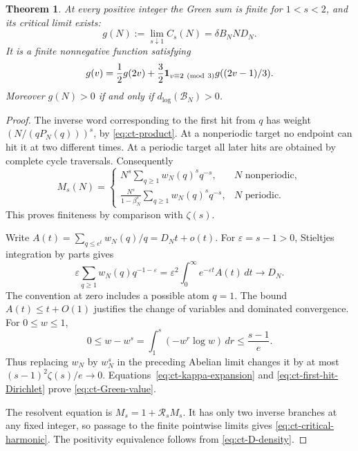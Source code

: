 \documentclass[11pt,a4paper]{article}
\newtheorem{theorem}{Theorem}
\begin{document}
\begin{theorem}\label{thm:ct-Green}
At every positive integer the Green sum is finite for \(1<s<2\),
and its critical limit exists:
\begin{equation}\label{eq:ct-Green-value}
 g(N):=\lim_{s\downarrow1}C_s(N)=\delta B_N N D_N.
\end{equation}
It is a finite nonnegative function satisfying
\begin{equation}\label{eq:ct-critical-harmonic}
 g(v)=\frac12g(2v)
       +\frac32\mathbf1_{v\equiv2\ ({\rm mod}\ 3)}g((2v-1)/3).
\end{equation}
Moreover \(g(N)>0\) if and only if \(d_{\log}(\mathcal B_N)>0\).
\end{theorem}
\begin{proof}
The inverse word corresponding to the first hit from \(q\) has
weight \((N/(qP_N(q)))^s\), by \eqref{eq:ct-product}.
At a nonperiodic target no endpoint can hit it at two different
times. At a periodic target all later hits are obtained by complete
cycle traversals. Consequently
\begin{equation}\label{eq:ct-first-hit-Dirichlet}
 M_s(N)=
 \begin{cases}
 N^s\displaystyle\sum_{q\ge1}w_N(q)^s q^{-s},
                       &N\text{ nonperiodic},\\[4pt]
 \displaystyle\frac{N^s}{1-\beta_N^s}
          \sum_{q\ge1}w_N(q)^s q^{-s},
                       &N\text{ periodic}.
 \end{cases}
\end{equation}
This proves finiteness by comparison with \(\zeta(s)\).

Write \(A(t)=\sum_{q\le e^t}w_N(q)/q=D_Nt+o(t)\).
For \(\varepsilon=s-1>0\), Stieltjes integration by parts gives
\[
 \varepsilon\sum_{q\ge1}w_N(q)q^{-1-\varepsilon}
       =\varepsilon^2\int_0^\infty e^{-\varepsilon t}A(t)\,dt
       \longrightarrow D_N.
\]
The convention at zero includes a possible atom \(q=1\).
The bound \(A(t)\le t+O(1)\) justifies the change of variables
and dominated convergence. For \(0\le w\le1\),
\[
 0\le w-w^s
 =\int_1^s(-w^r\log w)\,dr\le\frac{s-1}{e}.
\]
Thus replacing \(w_N\) by \(w_N^s\) in the preceding Abelian limit
changes it by at most
\((s-1)^2\zeta(s)/e\to0\).
Equations~\eqref{eq:ct-kappa-expansion} and
\eqref{eq:ct-first-hit-Dirichlet} prove \eqref{eq:ct-Green-value}.

The resolvent equation is \(M_s=1+\mathcal R_sM_s\).
It has only two inverse branches at any fixed integer, so passage
to the finite pointwise limits gives
\eqref{eq:ct-critical-harmonic}. The positivity equivalence follows
from \eqref{eq:ct-D-density}.
\end{proof}
\end{document}
